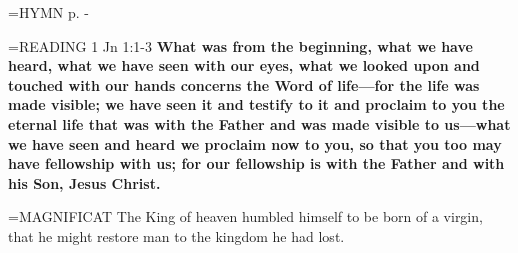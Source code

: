 \hangindent=\parindent \small{\uppercase{HYMN} p.  \pageref{christmas:firstHymn} - \pageref{christmas:lastHymn}\\}

\hangindent=\parindent \small{READING}    1 Jn 1:1-3 \textbf{   What was from the beginning, what we have heard, what we have seen with our eyes, what we looked upon and touched with our hands concerns the Word of life—for the life was made visible; we have seen it and testify to it and proclaim to you the eternal life that was with the Father and was made visible to us—what we have seen and heard we proclaim now to you, so that you too may have fellowship with us; for our fellowship is with the Father and with his Son, Jesus Christ.\\}

\hangindent=\parindent \small{MAGNIFICAT      The King of heaven humbled himself to be born of a virgin, that he might restore man to the kingdom he had lost.\\}

